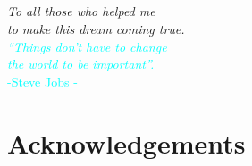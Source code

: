 \documentclass[a4paper,11pt,twoside]{ThesisStyle}
\begin{document}
%
\vspace{3cm}
{}       



\section*{}
\vspace{40ex}
\begin{flushright}

\textit{To all those who helped me \\
to make this dream coming true. } \\

\textcolor{cyan}{
\textit{``Things don't have to change \\
the world to be important''. \\} 
     -Steve Jobs - 
}
 
\end{flushright}
\cleardoublepage




\chapter*{Acknowledgements}

\end{document}
